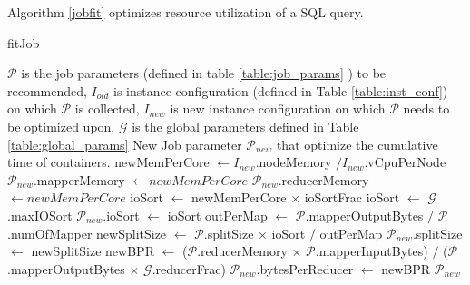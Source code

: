 Algorithm \ref{jobfit} optimizes resource utilization of a SQL query. 

\renewcommand{\algorithmicrequire}{\textbf{Input:}}
\renewcommand{\algorithmicensure}{\textbf{Output:}}
\renewcommand{\algorithmiccomment}[1]{// #1}
\begin{algorithm}
\caption{fitJob}\label{jobfit}
\begin{algorithmic}[1]
\footnotesize
\REQUIRE  $\mathcal{P}$ is the job parameters (defined in table \ref{table:job_params} ) to be recommended, $I_{old}$  is instance configuration (defined in Table \ref{table:inst_conf}) on which $\mathcal{P}$ is collected, $I_{new}$ is new instance configuration on which $\mathcal{P}$ needs to be optimized upon, $\mathcal{G}$ is the global parameters defined in Table \ref{table:global_params}
\ENSURE New Job parameter $\mathcal{P}_{new}$ that optimize the cumulative time of containers.
\STATE newMemPerCore $\gets I_{new}$.nodeMemory $/ I_{new}$.vCpuPerNode
\STATE $\mathcal{P}_{new}$.mapperMemory $\gets newMemPerCore$
\STATE $\mathcal{P}_{new}$.reducerMemory $\gets newMemPerCore$
\STATE ioSort $\gets$ newMemPerCore $\times$ ioSortFrac
\STATE ioSort $\gets$ $\mathcal{G}$.maxIOSort
\ENDIF
\STATE $\mathcal{P}_{new}$.ioSort $\gets$ ioSort
\STATE outPerMap $\gets$ $\mathcal{P}$.mapperOutputBytes $/$ $\mathcal{P}$.numOfMapper
\STATE newSplitSize $\gets$ $\mathcal{P}$.splitSize $\times$ ioSort $/$ outPerMap
\STATE $\mathcal{P}_{new}$.splitSize $\gets$ newSplitSize
\STATE newBPR $\gets$ ($\mathcal{P}$.reducerMemory $\times$ $\mathcal{P}$.mapperInputBytes) $/$ ($\mathcal{P}$.mapperOutputBytes $\times$ $\mathcal{G}$.reducerFrac)  
\STATE $\mathcal{P}_{new}$.bytesPerReducer $\gets$ newBPR
\STATE \RETURN $\mathcal{P}_{new}$
\end{algorithmic}
\end{algorithm}

%

